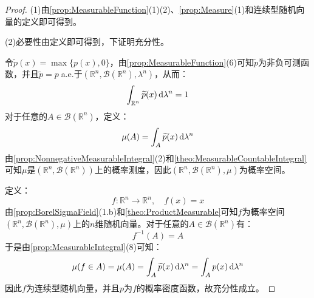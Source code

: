 \begin{proof}
	(1)由\cref{prop:MeasurableFunction}(1)(2)、\cref{prop:Measure}(1)和连续型随机向量的定义即可得到。\par
	(2)必要性由定义即可得到，下证明充分性。\par
	令$\widetilde{p}(x)=\max\{p(x),0\}$，由\cref{prop:MeasurableFunction}(6)可知$\widetilde{p}$为非负可测函数，并且$\widetilde{p}=p\;$a.e.于$(\mathbb{R}^{n},\mathcal{B}(\mathbb{R}^{n}),\lambda^n)$，从而：
	\begin{equation*}
		\int_{\mathbb{R}^{n}}\widetilde{p}(x)\mathop{}\!\mathrm{d}\lambda^n=1
	\end{equation*}
	对于任意的$A\in\mathcal{B}(\mathbb{R}^{n})$，定义：
	\begin{equation*}
		\mu(A)=\int_{A}\widetilde{p}(x)\mathop{}\!\mathrm{d}\lambda^n
	\end{equation*}
	由\cref{prop:NonnegativeMeasurableIntegral}(2)和\cref{theo:MeasurableCountableIntegral}可知$\mu$是$(\mathbb{R}^{n},\mathcal{B}(\mathbb{R}^{n}))$上的概率测度，因此$(\mathbb{R}^{n},\mathcal{B}(\mathbb{R}^{n}),\mu)$为概率空间。\par
	定义：
	\begin{equation*}
		f:\mathbb{R}^{n}\to\mathbb{R}^{n},\quad f(x)=x
	\end{equation*}
	由\cref{prop:BorelSigmaField}(1.b)和\cref{theo:ProductMeasurable}可知$f$为概率空间$(\mathbb{R}^{n},\mathcal{B}(\mathbb{R}^{n}),\mu)$上的$n$维随机向量。对于任意的$A\in\mathcal{B}(\mathbb{R}^{n})$有：
	\begin{equation*}
		f^{-1}(A)=A
	\end{equation*}
	于是由\cref{prop:MeasurableIntegral}(8)可知：
	\begin{equation*}
		\mu(f\in A)=\mu(A)=\int_{A}\widetilde{p}(x)\mathop{}\!\mathrm{d}\lambda^n=\int_{A}p(x)\mathop{}\!\mathrm{d}\lambda^n
	\end{equation*}
	因此$f$为连续型随机向量，并且$p$为$f$的概率密度函数，故充分性成立。
\end{proof}
